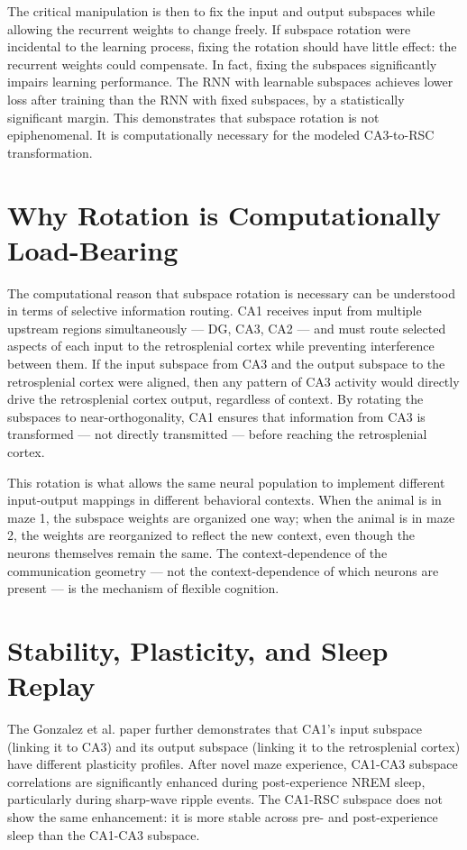 \documentclass[12pt, a4paper, openany]{book}
\theoremstyle{definition}
\theoremstyle{remark}
\begin{document}
The critical manipulation is then to fix the input and output subspaces while allowing the recurrent weights to change freely. If subspace rotation were incidental to the learning process, fixing the rotation should have little effect: the recurrent weights could compensate. In fact, fixing the subspaces significantly impairs learning performance. The RNN with learnable subspaces achieves lower loss after training than the RNN with fixed subspaces, by a statistically significant margin. This demonstrates that subspace rotation is not epiphenomenal. It is computationally necessary for the modeled CA3-to-RSC transformation.

\section{Why Rotation is Computationally Load-Bearing}

The computational reason that subspace rotation is necessary can be understood in terms of selective information routing. CA1 receives input from multiple upstream regions simultaneously — DG, CA3, CA2 — and must route selected aspects of each input to the retrosplenial cortex while preventing interference between them. If the input subspace from CA3 and the output subspace to the retrosplenial cortex were aligned, then any pattern of CA3 activity would directly drive the retrosplenial cortex output, regardless of context. By rotating the subspaces to near-orthogonality, CA1 ensures that information from CA3 is transformed — not directly transmitted — before reaching the retrosplenial cortex.

This rotation is what allows the same neural population to implement different input-output mappings in different behavioral contexts. When the animal is in maze 1, the subspace weights are organized one way; when the animal is in maze 2, the weights are reorganized to reflect the new context, even though the neurons themselves remain the same. The context-dependence of the communication geometry — not the context-dependence of which neurons are present — is the mechanism of flexible cognition.

\section{Stability, Plasticity, and Sleep Replay}

The Gonzalez et al. paper further demonstrates that CA1's input subspace (linking it to CA3) and its output subspace (linking it to the retrosplenial cortex) have different plasticity profiles. After novel maze experience, CA1-CA3 subspace correlations are significantly enhanced during post-experience NREM sleep, particularly during sharp-wave ripple events. The CA1-RSC subspace does not show the same enhancement: it is more stable across pre- and post-experience sleep than the CA1-CA3 subspace.
\end{document}
